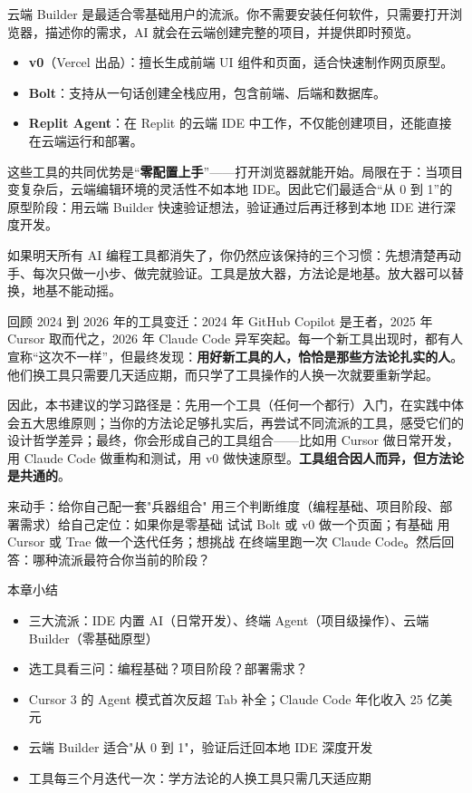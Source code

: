 云端 Builder 是最适合零基础用户的流派。你不需要安装任何软件，只需要打开浏览器，描述你的需求，AI 就会在云端创建完整的项目，并提供即时预览。

\begin{itemize}
  \item \textbf{v0}（Vercel 出品）：擅长生成前端 UI 组件和页面，适合快速制作网页原型。
  \item \textbf{Bolt}：支持从一句话创建全栈应用，包含前端、后端和数据库。
  \item \textbf{Replit Agent}：在 Replit 的云端 IDE 中工作，不仅能创建项目，还能直接在云端运行和部署。
\end{itemize}

这些工具的共同优势是“\textbf{零配置上手}”——打开浏览器就能开始。局限在于：当项目变复杂后，云端编辑环境的灵活性不如本地 IDE。因此它们最适合“从 0 到 1”的原型阶段：用云端 Builder 快速验证想法，验证通过后再迁移到本地 IDE 进行深度开发。


如果明天所有 AI 编程工具都消失了，你仍然应该保持的三个习惯：先想清楚再动手、每次只做一小步、做完就验证。工具是放大器，方法论是地基。放大器可以替换，地基不能动摇。

回顾 2024 到 2026 年的工具变迁：2024 年 GitHub Copilot 是王者，2025 年 Cursor 取而代之，2026 年 Claude Code 异军突起。每一个新工具出现时，都有人宣称“这次不一样”，但最终发现：\textbf{用好新工具的人，恰恰是那些方法论扎实的人}。他们换工具只需要几天适应期，而只学了工具操作的人换一次就要重新学起。

因此，本书建议的学习路径是：先用一个工具（任何一个都行）入门，在实践中体会五大思维原则；当你的方法论足够扎实后，再尝试不同流派的工具，感受它们的设计哲学差异；最终，你会形成自己的工具组合——比如用 Cursor 做日常开发，用 Claude Code 做重构和测试，用 v0 做快速原型。\textbf{工具组合因人而异，但方法论是共通的}。

\begin{tcbpractice}{来动手：给你自己配一套"兵器组合"}
用三个判断维度（编程基础、项目阶段、部署需求）给自己定位：如果你是零基础 试试 Bolt 或 v0 做一个页面；有基础 用 Cursor 或 Trae 做一个迭代任务；想挑战 在终端里跑一次 Claude Code。然后回答：哪种流派最符合你当前的阶段？

\end{tcbpractice}

\begin{tcbsummary}{本章小结}
\begin{itemize}
  \item 三大流派：IDE 内置 AI（日常开发）、终端 Agent（项目级操作）、云端 Builder（零基础原型）
  \item 选工具看三问：编程基础？项目阶段？部署需求？
  \item Cursor 3 的 Agent 模式首次反超 Tab 补全；Claude Code 年化收入 25 亿美元
  \item 云端 Builder 适合"从 0 到 1"，验证后迁回本地 IDE 深度开发
  \item 工具每三个月迭代一次：学方法论的人换工具只需几天适应期
\end{itemize}

\end{tcbsummary}
